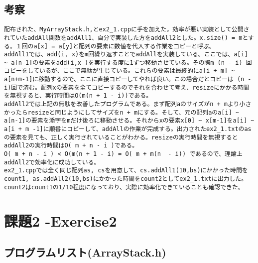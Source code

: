 \documentclass[11pt,a4paper]{jsarticle}
\begin{document}
\subsection{考察}
\begin{verbatim}
配布された、MyArrayStack.h,とex2_1.cppに手を加えた。効率が悪い実装として公開されていたaddAll関数をaddAll1、自分で実装した方をaddAll2とした。x.size() = mとする。１回のa[x] = a[y]と配列の要素に数値を代入する作業をコピーと呼ぶ。
addAll1では、add(i, x)をm回繰り返すことでaddAllを実装している。ここでは、a[i] ~ a[n-1]の要素をadd(i,x )を実行する度に1ずつ移動させている。その際m (n - i) 回コピーをしているが、ここで無駄が生じている。これらの要素は最終的にa[i + m] ~ a[n+m-1]に移動するので、ここに直接コピーしてやれば良い。この場合だとコピーは (n - i)回で済む。配列xの要素を全てコピーするのでそれを合わせて考え、resizeにかかる時間を無視すると、実行時間はO(m(n + 1 - i))である。
addAll2では上記の無駄を改善したプログラムである。まず配列aのサイズがn + mより小さかったらresizeと同じようにしてサイズをn + mにする。そして、元の配列aのa[i] ~ a[n-1]の要素を添字をmだけ後ろに移動させる。それからxの要素x[0] ~ x[m-1]をa[i] ~ a[i + m -1]に順番にコピーして、addAllの作業が完成する。出力されたex2_1.txtのasの要素を見ても、正しく実行されていることがわかる。resizeの実行時間を無視するとaddAll2の実行時間はO( m + n - i )である。
O( m + n - i ) < O(m(n + 1 - i) = O( m + m(n  - i)) であるので、理論上addAll2で効率化に成功している。
ex2_1.cppでは全く同じ配列as, csを用意して、cs.addAll1(10,bs)にかかった時間をcount1, as.addAll2(10,bs)にかかった時間をcount2としてex2_1.txtに出力した。
count2はcount1の1/10程度になっており、実際に効率化できていることも確認できた。
\end{verbatim}
%
\section{課題2 -Exercise2}
\subsection{プログラムリスト(ArrayStack.h)}
\label{sec:prog-list2}
\end{document}
